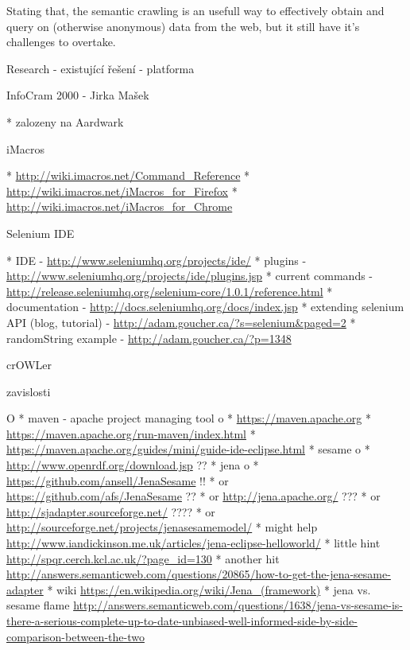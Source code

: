 Stating that, the semantic crawling is an usefull way to effectively obtain and
query on (otherwise anonymous) data from the web, but it still have it's challenges
to overtake. 




\sec Research - existující řešení - platforma


\secc InfoCram 2000 - Jirka Mašek

\begitems
  * zalozeny na Aardwark 
\enditems


\secc iMacros

\begitems
  * \url{http://wiki.imacros.net/Command_Reference}
  * \url{http://wiki.imacros.net/iMacros_for_Firefox}
  * \url{http://wiki.imacros.net/iMacros_for_Chrome}
\enditems



%



\secc Selenium IDE

\begitems
  * IDE - \url{http://www.seleniumhq.org/projects/ide/}
  * plugins - \url{http://www.seleniumhq.org/projects/ide/plugins.jsp}
  * current commands - \url{http://release.seleniumhq.org/selenium-core/1.0.1/reference.html}
  * documentation - \url{http://docs.seleniumhq.org/docs/index.jsp}
  * extending selenium API (blog, tutorial) - \url{http://adam.goucher.ca/?s=selenium&paged=2}
  \begitems
    * randomString example - \url{http://adam.goucher.ca/?p=1348}
  \enditems
\enditems






\sec crOWLer

\secc zavislosti

\begitems \style O
  * maven - apache project managing tool
  \begitems \style o
    * \url{https://maven.apache.org}
    * \url{https://maven.apache.org/run-maven/index.html}
    * \url{https://maven.apache.org/guides/mini/guide-ide-eclipse.html}
  \enditems
  * sesame
  \begitems \style o
    * \url{http://www.openrdf.org/download.jsp} ??
  \enditems
  * jena
  \begitems \style o
    * \url{https://github.com/ansell/JenaSesame} !!
    * or \url{https://github.com/afs/JenaSesame} ??
    * or \url{http://jena.apache.org/} ???
    * or \url{http://sjadapter.sourceforge.net/} ????
    * or \url{http://sourceforge.net/projects/jenasesamemodel/}
    * might help \url{http://www.iandickinson.me.uk/articles/jena-eclipse-helloworld/}
    * little hint \url{http://spqr.cerch.kcl.ac.uk/?page_id=130}
    * another hit \url{http://answers.semanticweb.com/questions/20865/how-to-get-the-jena-sesame-adapter}
    * wiki \url{https://en.wikipedia.org/wiki/Jena_(framework)}
    * jena vs. sesame flame \url{http://answers.semanticweb.com/questions/1638/jena-vs-sesame-is-there-a-serious-complete-up-to-date-unbiased-well-informed-side-by-side-comparison-between-the-two}
  \enditems
\enditems


